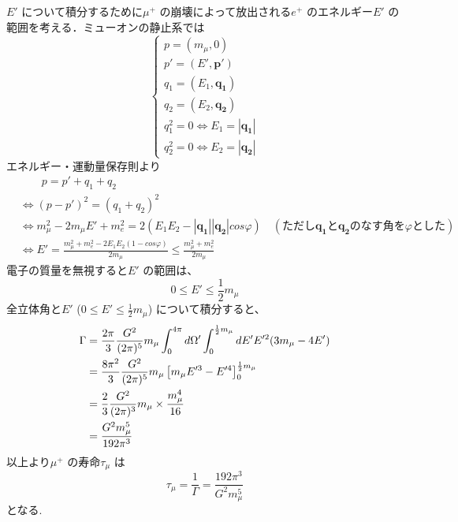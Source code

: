 %
$E'$ について積分するために$\mu^{+}$ の崩壊によって放出される$e^{+}$ のエネルギー$E'$ の範囲を考える．ミューオンの静止系では
%
\[\begin{cases}
  p=(m_{\mu},0)\\
  p'=(E',\bm{p'})\\
  q_{1}=(E_{1},\bm{q_{1}})\\
  q_{2}=(E_{2},\bm{q_{2}})\\
  q_{1}^{2}=0\Leftrightarrow E_{1}=|\bm{q_{1}}|\\
  q_{2}^{2}=0\Leftrightarrow E_{2}=|\bm{q_{2}}|
\end{cases}\]
%
エネルギー・運動量保存則より
%
\begin{align*}
  &\qquad p=p'+q_{1}+q_{2}\\
  &\Leftrightarrow (p-p')^{2}=(q_{1}+q_{2})^{2}\\
  &\Leftrightarrow m_{\mu}^{2}-2m_{\mu}E'+m_{e}^{2}=2(E_{1}E_{2}-|\bm{q_{1}}||\bm{q_{2}}|cos\varphi)\quad(ただし\bm{q_{1}} と\bm{q_{2}} のなす角を\varphi とした)\\
  &\Leftrightarrow E'=\frac{m_{\mu}^{2}+m_{e}^{2}-2E_{1}E_{2}(1-cos\varphi)}{2m_{\mu}}
  \le \frac{m_{\mu}^{2}+m_{e}^{2}}{2m_{\mu}}
\end{align*}
%
電子の質量を無視すると$E'$ の範囲は、
%
\[
0\le E'\le \frac{1}{2}m_{\mu}
\]
%
全立体角と$E'$ ($0\le E'\le\frac{1}{2}m_{\mu}$) について積分すると、
\begin{align}
  \Gamma&=\frac{2\pi}{3}\frac{G^{2}}{(2\pi)^{5}}m_{\mu}\int_{0}^{4\pi}d\Omega'\int_{0}^{\frac{1}{2}m_{\mu}}dE'E'^{2}(3m_{\mu}-4E')\notag\\
  &=\frac{8\pi^{2}}{3}\frac{G^{2}}{(2\pi)^{5}}m_{\mu}\left[m_{\mu}E'^{3}-E'^{4}\right]_{0}^{\frac{1}{2}m_{\mu}}\notag\\
  &=\frac{2}{3}\frac{G^{2}}{(2\pi)^{3}}m_{\mu}\times \frac{m_{\mu}^{4}}{16}\notag\\
  &=\frac{G^{2}m_{\mu}^{5}}{192\pi^{3}}
\end{align}
%
以上より$\mu^{+}$ の寿命$\tau_{\mu}$ は
\[\tau_{\mu}=\frac{1}{\Gamma}=\frac{192\pi^{3}}{G^{2}m_{\mu}^{5}}\]
となる.
%
%
%
